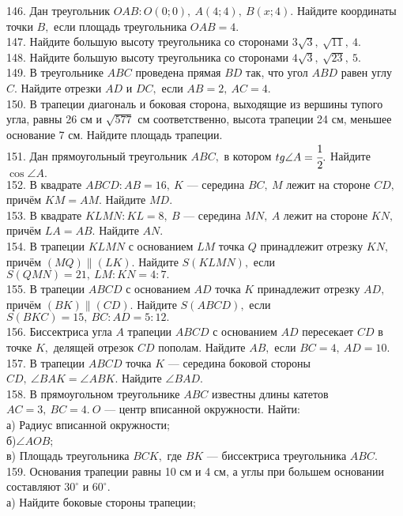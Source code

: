 146. Дан треугольник $OAB: O(0;0),\ A(4;4),\ B(x;4).$ Найдите координаты точки $B,$ если площадь треугольника $OAB=4.$\\
147. Найдите большую высоту треугольника со сторонами $3\sqrt{3},\ \sqrt{11},\ 4.$\\
148. Найдите большую высоту треугольника со сторонами $4\sqrt{3},\ \sqrt{23},\ 5.$\\
149. В треугольнике $ABC$ проведена прямая $BD$ так, что угол $ABD$ равен углу $C.$ Найдите отрезки $AD$ и $DC,$ если $AB=2,\ AC=4.$\\
150. В трапеции диагональ и боковая сторона, выходящие из вершины тупого угла, равны 26 см и $\sqrt{577}$ см соответственно, высота трапеции 24 см, меньшее основание 7 см. Найдите площадь трапеции.\\
151. Дан прямоугольный треугольник $ABC,$ в котором $tg\angle A=\cfrac{1}{2}.$ Найдите $\cos \angle A.$\\
152. В квадрате $ABCD: AB=16,\ K$ --- середина $BC,\ M$ лежит на стороне $CD,$ причём $KM=AM.$ Найдите $MD.$\\
153. В квадрате $KLMN: KL=8,\ B$ --- середина $MN,\ A$ лежит на стороне $KN,$ причём $LA=AB.$ Найдите $AN.$\\
154. В трапеции $KLMN$ с основанием $LM$ точка $Q$ принадлежит отрезку $KN,$ причём $(MQ)\parallel(LK).$ Найдите $S(KLMN),$ если $S(QMN)=21,\ LM:KN=4:7.$\\
155. В трапеции $ABCD$ с основанием $AD$ точка $K$ принадлежит отрезку $AD,$ причём $(BK)\parallel(CD).$ Найдите $S(ABCD),$ если $S(BKC)=15,\ BC:AD=5:12.$\\
156. Биссектриса угла $A$ трапеции $ABCD$ с основанием $AD$ пересекает $CD$ в точке $K,$ делящей отрезок $CD$ пополам. Найдите $AB,$ если $BC=4,\ AD=10.$\\
157. В трапеции $ABCD$ точка $K$ --- середина боковой стороны $CD,\ \angle BAK=\angle ABK.$ Найдите $\angle BAD.$\\
158. В прямоугольном треугольнике $ABC$ известны длины катетов $AC=3,\ BC=4.\ O$ --- центр вписанной окружности. Найти:\\
а) Радиус вписанной окружности;\\
б)$\angle AOB;$\\
в) Площадь треугольника $BCK,$ где $BK$ --- биссектриса треугольника $ABC.$\\
159. Основания трапеции равны 10 см и 4 см, а углы при большем основании составляют $30^\circ$ и $60^\circ.$\\
а) Найдите боковые стороны трапеции;\\

